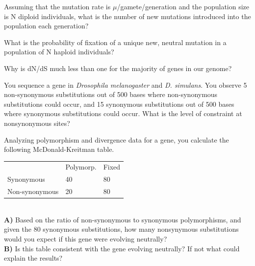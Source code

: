  \begin{question}{}
Assuming that the mutation rate is $\mu$/gamete/generation and the population size is N diploid individuals, what is the number of new mutations introduced into the population each generation?
\end{question}


\begin{question}{}
What is the probability of fixation of a unique new, neutral mutation in a population of N haploid individuals?
\end{question}

\begin{question}{}
Why is dN/dS much less than one for the majority of genes in our genome?
\end{question}

\begin{question}{}
You sequence a gene in {\it Drosophila melanogaster} and {\it D. simulans}. You
observe 5 non-synonymous substitutions out of 500 bases where
non-synonymous substitutions could occur, and 15 synonymous substitutions out of 500 bases where synonymous substitutions could
occur. What is the level of constraint at nonsynonymous sites?
\end{question}

\begin{question}{}
Analyzing polymorphism and divergence data for a gene, you calculate the
following McDonald-Kreitman table.
\begin{tabular}{lll}
 & Polymorp. & Fixed\\
Synonymous & 40 & 80  \\
Non-synonymous& 20 & 80\\
\end{tabular} \\
{\bf A)} Based on the ratio of non-synonymous to synonymous polymorphisms,
and given the 80 synonymous substitutions, how many nonsynymous
substitutions would you expect if this gene were evolving neutrally?\\
{\bf B)} Is this table consistent with the gene evolving neutrally? If not what could explain the results?
\end{question}

